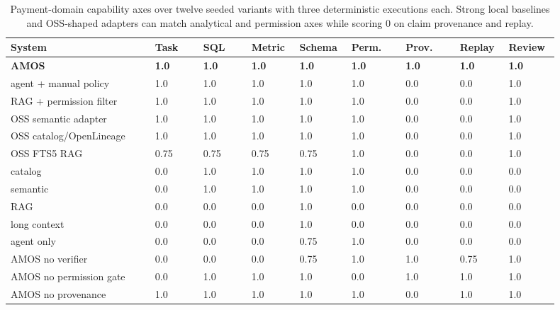 \documentclass[10pt]{article}
\newcommand{\amos}{\textsc{AMOS}\xspace}
\begin{document}
\begin{table}[p]
\centering
\scriptsize
\setlength{\tabcolsep}{2.2pt}
\begin{tabular}{L{0.24\linewidth}C{0.08\linewidth}C{0.08\linewidth}C{0.08\linewidth}C{0.08\linewidth}C{0.09\linewidth}C{0.09\linewidth}C{0.08\linewidth}C{0.08\linewidth}}
\toprule
\textbf{System} & \textbf{Task} & \textbf{SQL} & \textbf{Metric} & \textbf{Schema} & \textbf{Perm.} & \textbf{Prov.} & \textbf{Replay} & \textbf{Review} \\
\midrule
\textbf{\amos} & \textbf{1.0} & \textbf{1.0} & \textbf{1.0} & \textbf{1.0} & \textbf{1.0} & \textbf{1.0} & \textbf{1.0} & \textbf{1.0} \\
agent + manual policy & 1.0 & 1.0 & 1.0 & 1.0 & 1.0 & 0.0 & 0.0 & 1.0 \\
RAG + permission filter & 1.0 & 1.0 & 1.0 & 1.0 & 1.0 & 0.0 & 0.0 & 1.0 \\
OSS semantic adapter & 1.0 & 1.0 & 1.0 & 1.0 & 1.0 & 0.0 & 0.0 & 1.0 \\
OSS catalog/OpenLineage & 1.0 & 1.0 & 1.0 & 1.0 & 1.0 & 0.0 & 0.0 & 1.0 \\
OSS FTS5 RAG & 0.75 & 0.75 & 0.75 & 0.75 & 1.0 & 0.0 & 0.0 & 1.0 \\
catalog & 0.0 & 1.0 & 1.0 & 1.0 & 1.0 & 0.0 & 0.0 & 0.0 \\
semantic & 0.0 & 1.0 & 1.0 & 1.0 & 1.0 & 0.0 & 0.0 & 0.0 \\
RAG & 0.0 & 0.0 & 0.0 & 1.0 & 0.0 & 0.0 & 0.0 & 0.0 \\
long context & 0.0 & 0.0 & 0.0 & 1.0 & 0.0 & 0.0 & 0.0 & 0.0 \\
agent only & 0.0 & 0.0 & 0.0 & 0.75 & 1.0 & 0.0 & 0.0 & 0.0 \\
\amos no verifier & 0.0 & 0.0 & 0.0 & 0.75 & 1.0 & 1.0 & 0.75 & 1.0 \\
\amos no permission gate & 0.0 & 1.0 & 1.0 & 1.0 & 0.0 & 1.0 & 1.0 & 1.0 \\
\amos no provenance & 1.0 & 1.0 & 1.0 & 1.0 & 1.0 & 0.0 & 1.0 & 1.0 \\
\bottomrule
\end{tabular}
\caption{Payment-domain capability axes over twelve seeded variants with three deterministic executions each. Strong local baselines and OSS-shaped adapters can match analytical and permission axes while scoring 0 on claim provenance and replay.}
\label{tab:metric-axes}
\end{table}

\clearpage
\end{document}
